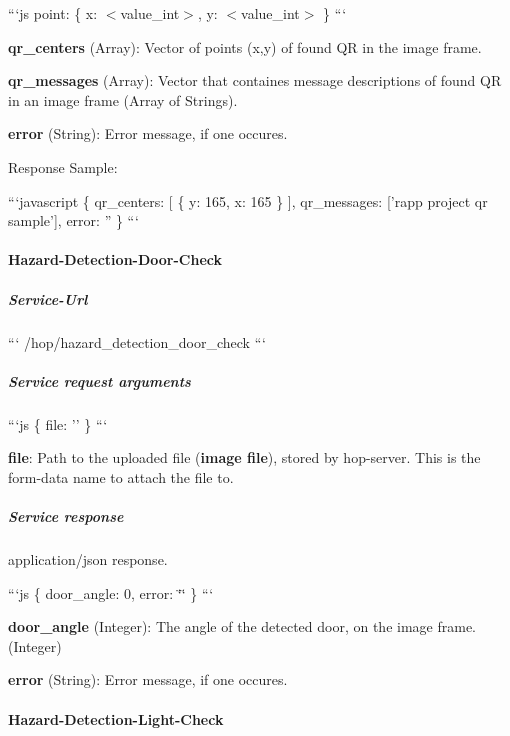 ```js point\-: \{ x\-: $<$value\-\_\-int$>$, y\-: $<$value\-\_\-int$>$ \} ```


\begin{DoxyItemize}
\item {\bfseries qr\-\_\-centers} (Array)\-: Vector of points (x,y) of found Q\-R in the image frame.
\item {\bfseries qr\-\_\-messages} (Array)\-: Vector that containes message descriptions of found Q\-R in an image frame (Array of Strings).
\item {\bfseries error} (String)\-: Error message, if one occures.
\end{DoxyItemize}

Response Sample\-:

```javascript \{ qr\-\_\-centers\-: \mbox{[} \{ y\-: 165, x\-: 165 \} \mbox{]}, qr\-\_\-messages\-: \mbox{[}'rapp project qr sample'\mbox{]}, error\-: '' \} ```

\paragraph*{Hazard-\/\-Detection-\/\-Door-\/\-Check}

\subparagraph*{Service-\/\-Url}

``` /hop/hazard\-\_\-detection\-\_\-door\-\_\-check ```

\subparagraph*{Service request arguments}

```js \{ file\-: '' \} ```


\begin{DoxyItemize}
\item {\bfseries file}\-: Path to the uploaded file ({\bfseries image file}), stored by hop-\/server. This is the form-\/data name to attach the file to.
\end{DoxyItemize}

\subparagraph*{Service response}

application/json response.

```js \{ door\-\_\-angle\-: 0, error\-: \char`\"{}\char`\"{} \} ```


\begin{DoxyItemize}
\item {\bfseries door\-\_\-angle} (Integer)\-: The angle of the detected door, on the image frame. (Integer)
\item {\bfseries error} (String)\-: Error message, if one occures.
\end{DoxyItemize}

\paragraph*{Hazard-\/\-Detection-\/\-Light-\/\-Check}

